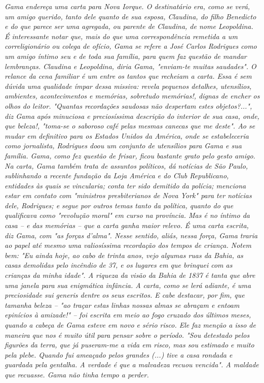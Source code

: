 \emph{Gama endereça uma carta para Nova Iorque. O destinatário era, como
se verá, um amigo querido, tanto dele quanto de sua esposa, Claudina, do
filho Benedicto e do que parece ser uma agregada, ou parente de
Claudina, de nome Leopoldina. É interessante notar que, mais do que uma
correspondência remetida a um correligionário ou colega de ofício, Gama
se refere a José Carlos Rodrigues como um amigo íntimo seu e de toda sua
família, para quem faz questão de mandar lembranças. Claudina e
Leopoldina, diria Gama, "enviam-te muitas saudades". O relance da cena
familiar é um entre os tantos que recheiam a carta. Essa é sem dúvida
uma qualidade ímpar dessa missiva: revela pequenos detalhes, utensílios,
ambientes, acontecimentos e memórias, sobretudo memórias!, dignas de
encher os olhos do leitor. "Quantas recordações saudosas não despertam
estes objetos?...", diz Gama após minuciosa e preciosíssima descrição do
interior de sua casa, onde, que beleza!, "toma-se o saboroso café pelas
mesmas canecas que me deste". Ao se mudar em definitivo para os Estados
Unidos da América, onde se estabeleceria como jornalista, Rodrigues doou
um conjunto de utensílios para Gama e sua família. Gama, como fez
questão de frisar, ficou bastante grato pelo gesto amigo. Na carta, Gama
também trata de assuntos políticos, dá notícias de São Paulo,
sublinhando a recente fundação da Loja América e do Club Republicano,
entidades às quais se vincularia; conta ter sido demitido da polícia;
menciona estar em contato com "ministros presbiterianos de Nova York"
para ter notícias dele, Rodrigues; e segue por outros temas tanto da
política, quanto do que qualificava como "revolução moral" em curso na
província. Mas é no íntimo da casa -- e das memórias -- que a carta
ganha maior relevo. É uma carta escrita, diz Gama, com "as forças
d'alma". Nesse sentido, aliás, nessa força, Gama traria ao papel até
mesmo uma valiosíssima recordação dos tempos de criança. Notem bem: "Eu
ainda hoje, ao cabo de trinta anos, vejo algumas ruas da Bahia, as casas
demolidas pelo incêndio de 37, e os lugares em que brinquei com as
crianças da minha idade". A riqueza da visão da Bahia de 1837 é tanta
que abre uma janela para sua enigmática infância. A carta, como se lerá
adiante, é uma preciosidade sui generis dentre os seus escritos. E cabe
destacar, por fim, que tamanha beleza -- "ao traçar estas linhas nossas
almas se abraçam e entoam epinícios à amizade!" -- foi escrita em meio
ao fogo cruzado dos últimos meses, quando a cabeça de Gama esteve em
novo e sério risco. Ele faz menção a isso de maneira que nos é muito
útil para pensar sobre o período. "Sou detestado pelos figurões da
terra, que já puseram-me a vida em risco, mas sou estimado e muito pela
plebe. Quando fui ameaçado pelos grandes (...) tive a casa rondada e
guardada pela gentalha. A verdade é que a malvadeza recuou vencida". A
maldade que recuasse. Gama não tinha tempo a perder.}

